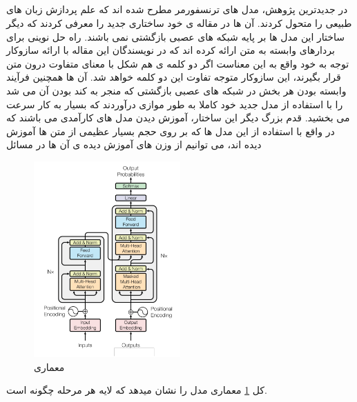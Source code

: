 \subsection{}
در جدیدترین پژوهش، مدل های ترنسفورمر مطرح شده اند که علم پردازش زبان های طبیعی را متحول کردند. آن ها در
مقاله ی خود ساختاری جدید را معرفی کردند که دیگر ساختار این مدل ها بر پایه شبکه های عصبی بازگشتی نمی باشند.
راه حل نوینی برای بردارهای وابسته به متن ارائه کرده اند که در
نویسندگان این مقاله با ارائه سازوکار توجه به خود
واقع به این معناست اگر دو کلمه ی هم شکل با معنای متفاوت درون متن قرار بگیرند، این سازوکار متوجه تفاوت این دو کلمه
خواهد شد. آن ها همچنین فرآیند وابسته بودن هر بخش در شبکه های عصبی بازگشتی که منجر به کند بودن آن می شد را
با استفاده از مدل جدید خود کاملا به طور موازی درآوردند که بسیار به کار سرعت می بخشید.
قدم بزرگ دیگر این ساختار، آموزش دیدن مدل های کارآمدی می باشند که در واقع با استفاده
از این مدل ها که بر روی حجم بسیار عظیمی از متن ها آموزش دیده اند، می توانیم از وزن های آموزش دیده ی آن ها در مسائل
\begin{figure}[H]
	\centering
	\includegraphics[width=0.5\textwidth]{figures/Transformer.png}
	\caption{معماری }
	\label{fig:Transformer}
\end{figure}
کل \ref{fig:Transformer} معماری مدل  را نشان میدهد که لایه هر مرحله چگونه است.

